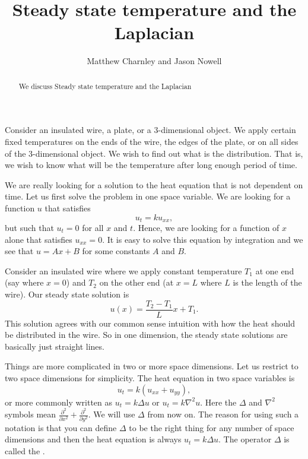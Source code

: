 \documentclass{ximera}
\title{Steady state temperature and the Laplacian}
\author{Matthew Charnley and Jason Nowell}
\begin{document}
\begin{abstract}
    We discuss Steady state temperature and the Laplacian
\end{abstract}
\maketitle


\label{dirich:section}




Consider an insulated wire, a plate, or a 3-dimensional object. We apply certain fixed temperatures on the ends of the wire, the edges of the plate, or on all sides of the 3-dimensional object.  We wish to find out what is the \emph{} distribution.  That is, we wish to know what will be the temperature after long enough period of time.

We are really looking for a solution to the heat equation that is not dependent on time.  Let us first solve the problem in one space variable.  We are looking for a function $u$ that satisfies
\begin{equation*}
    u_t = k u_{xx} ,
\end{equation*}
but such that $u_t = 0$ for all $x$ and $t$.  Hence, we are looking for a function of $x$ alone that satisfies $u_{xx} = 0$.  It is easy to solve this equation by integration and we see that $u = Ax+B$ for some constants $A$ and $B$.

Consider an insulated wire where we apply constant temperature $T_1$ at one end (say where $x=0$) and $T_2$ on the other end (at $x=L$ where $L$ is the length of the wire).  Our steady state solution is
\begin{equation*}
    u(x) = \frac{T_2-T_1}{L} x + T_1 .
\end{equation*}
This solution agrees with our common sense intuition with how the heat should be distributed in the wire.  So in one dimension, the steady state solutions are basically just straight lines.

Things are more complicated in two or more space dimensions.  Let us restrict to two space dimensions for simplicity.  The heat equation in two space variables is
\begin{equation} \label{dirich:heateq}
    u_t = k(u_{xx} + u_{yy}) ,
\end{equation}
or more commonly written as $u_t = k \Delta u$ or $u_t = k \nabla^2 u$.  Here the $\Delta$ and $\nabla^2$ symbols mean $\frac{\partial^2}{\partial x^2} + \frac{\partial^2}{\partial y^2}$.  We will use $\Delta$ from now on.  The reason for using such a notation is that you can define $\Delta$ to be the right thing for any number of space dimensions and then the heat equation is always $u_t = k \Delta u$.  The operator $\Delta$ is called the \emph{}.
\end{document}
